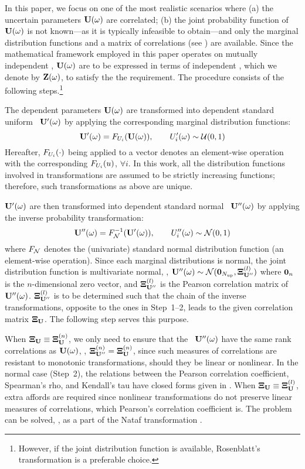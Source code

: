 In this paper, we focus on one of the most realistic scenarios where (a) the uncertain parameters $\mathbf{U}(\omega)$ are correlated; (b) the joint probability function of $\mathbf{U}(\omega)$ is not known---as it is typically infeasible to obtain---and only the marginal distribution functions and a matrix of correlations (see ) are available. Since the mathematical framework employed in this paper operates on mutually independent \rvs, $\mathbf{U}(\omega)$ are to be expressed in terms of independent \rvs, which we denote by $\mathbf{Z}(\omega)$, to satisfy the the requirement. The procedure consists of the following steps.\footnote{However, if the joint distribution function is available, Rosenblatt's transformation \cite{rosenblatt1952} is a preferable choice.}

 The dependent parameters $\mathbf{U}(\omega)$ are transformed into dependent standard uniform \rvs\ $\mathbf{U}'(\omega)$ by applying the corresponding marginal distribution functions:
\begin{equation} \elabel{dependent-uniform}
  \vU'(\o) = \CDF_{\U_i}(\vU(\o)), \qquad \U'_i(\o) \sim \uniform(0, 1)
\end{equation}
Hereafter, $F_{U_i}(\cdot)$ being applied to a vector denotes an element-wise operation with the corresponding $F_{U_i}(u)$, $\forall i$. In this work, all the distribution functions involved in transformations are assumed to be strictly increasing functions; therefore, such transformations as above are unique.

 $\mathbf{U}'(\omega)$ are then transformed into dependent standard normal \rvs\ $\mathbf{U}''(\omega)$ by applying the inverse probability transformation:
\begin{equation} \elabel{dependent-normal}
  \vU''(\o) = \CDF^{-1}_\normal(\vU'(\o)), \qquad \U''_i(\o) \sim \normal(0, 1)
\end{equation}
where $F_{\mathcal{N}}$ denotes the (univariate) standard normal distribution function (an element-wise operation). Since each marginal distributions is normal, the joint distribution function is multivariate normal, \ie, $\mathbf{U}''(\omega) \sim \mathcal{N}(\mathbf{0}_{N_\text{up}}, \mathbf{\Xi}^{(l)}_{\mathbf{U}''})$ where $\mathbf{0}_n$ is the $n$-dimensional zero vector, and $\mathbf{\Xi}^{(l)}_{\mathbf{U}''}$ is the Pearson correlation matrix of $\mathbf{U}''(\omega)$. $\mathbf{\Xi}^{(l)}_{\mathbf{U}''}$ is to be determined such that the chain of the inverse transformations, opposite to the ones in Step~1--2, leads to the given correlation matrix $\mathbf{\Xi}_{\mathbf{U}}$. The following step serves this purpose.

 When $\mathbf{\Xi}_{\mathbf{U}} \equiv \mathbf{\Xi}^{(n)}_{\mathbf{U}}$, we only need to ensure that the \rvs\ $\mathbf{U}''(\omega)$ have the same rank correlations as $\mathbf{U}(\omega)$, \ie, $\mathbf{\Xi}^{(n)}_{\mathbf{U}''} = \mathbf{\Xi}^{(n)}_{\mathbf{U}}$, since such measures of correlations are resistant to monotonic transformations, should they be linear or nonlinear. In the normal case (Step~2), the relations between the Pearson correlation coefficient, Spearman's rho, and Kendall's tau have closed forms given in . When $\mathbf{\Xi}_{\mathbf{U}} \equiv \mathbf{\Xi}^{(l)}_{\mathbf{U}}$, extra affords are required since nonlinear transformations do not preserve linear measures of correlations, which Pearson's correlation coefficient is. The problem can be solved, \eg, as a part of the Nataf transformation \cite{li2008}.

